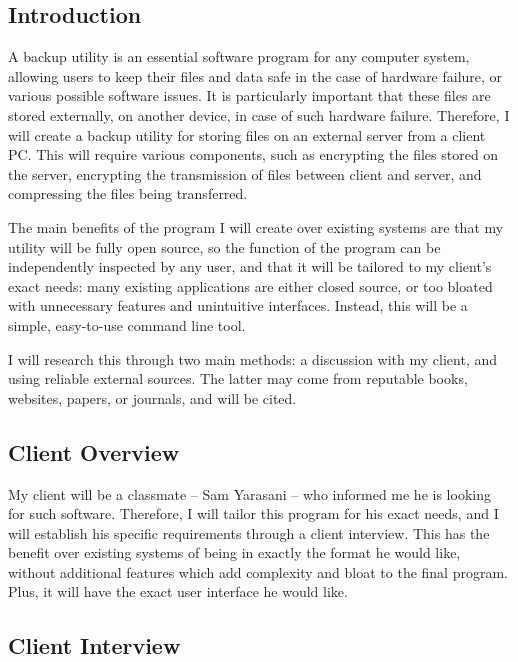 \documentclass[../main.tex]{subfiles}
\begin{document}
\newenvironment{qanda}{\setlength{\parindent}{0pt}}{\bigskip}
\newcommand{\Q}{\bigskip\bfseries Q: }
\newcommand{\A}{\par\textbf{A:} \normalfont}

\subsection{Introduction}

A backup utility is an essential software program for any computer system, allowing users to keep their files and data safe in the case of hardware failure, or various possible software issues. It is particularly important that these files are stored externally, on another device, in case of such hardware failure. Therefore, I will create a backup utility for storing files on an external server from a client PC. This will require various components, such as encrypting the files stored on the server, encrypting the transmission of files between client and server, and compressing the files being transferred. 

The main benefits of the program I will create over existing systems are that my utility will be fully open source, so the function of the program can be independently inspected by any user, and that it will be tailored to my client’s exact needs: many existing applications are either closed source, or too bloated with unnecessary features and unintuitive interfaces. Instead, this will be a simple, easy-to-use command line tool.

I will research this through two main methods: a discussion with my client, and using reliable external sources. The latter may come from reputable books, websites, papers, or journals, and will be cited. 

\subsection{Client Overview}

My client will be a classmate – Sam Yarasani – who informed me he is looking for such software. Therefore, I will tailor this program for his exact needs, and I will establish his specific requirements through a client interview. This has the benefit over existing systems of being in exactly the format he would like, without additional features which add complexity and bloat to the final program. Plus, it will have the exact user interface he would like.

\subsection{Client Interview} \label{ClientInterview}
\end{document}
